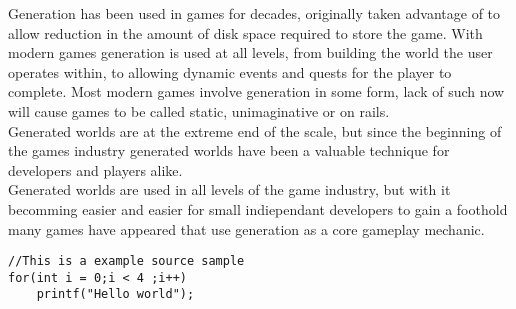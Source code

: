 Generation has been used in games for decades, originally taken advantage
of to allow reduction in the amount of disk space required to store the game.
With modern games generation is used at all levels, from building the world the
user operates within, to allowing dynamic events and quests for the player to
complete. Most modern games involve generation in some form, lack of such now 
will cause games to be called static, unimaginative or on rails.\\

Generated worlds are at the extreme end of the scale, but since the beginning of
the games industry generated worlds have been a valuable technique for developers
and players alike.\\ 

Generated worlds are used in all levels of the game industry, but with it
becomming easier and easier for small indiependant developers to gain a foothold
many games have appeared that use generation as a core gameplay mechanic.\\

\begin{lstlisting}
//This is a example source sample
for(int i = 0;i < 4 ;i++)
	printf("Hello world");

\end{lstlisting}
